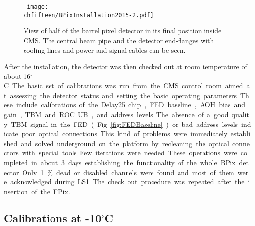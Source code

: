 \begin{figure}[!htb]
 \begin{center}
 \texttt{[image: \\chfifteen/BPixInstallation2015-2.pdf]}
 \end{center}
 \caption{View of half of the barrel pixel detector in its final position inside CMS. The central beam pipe and the detector end-flanges with cooling lines and power and signal cables can be seen.}
 \label{fig:BPixInst3}
\end{figure}

After the installation, the detector was then checked out at room temperature of about 16\unit{$^\circ$C}.
The basic set of calibrations was run from the CMS control room aimed at assessing the detector status and setting the basic operating parameters.
These include calibrations of the Delay25 chip, FED baseline, AOH bias and gain, TBM and ROC UB, and address levels.
The absence of a good quality TBM signal in the FED (Fig.~\ref{fig:FEDBaseline}) or bad address levels indicate poor optical connections.
This kind of problems were immediately established and solved underground on the platform by recleaning the optical connectors with special tools.
Few iterations were needed.
These operations were completed in about 3 days establishing the functionality of the whole BPix detector.
Only 1\% dead or disabled channels were found and most of them were acknowledged during LS1.
The check out procedure was repeated after the insertion of the FPix.

\subsection{Calibrations at -10\unit{$^\circ$C}}\label{sec:FinalBPixCalib}

